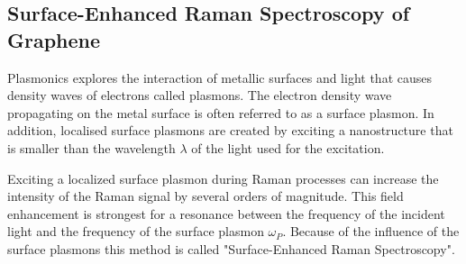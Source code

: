 \subsection{Surface-Enhanced Raman Spectroscopy of Graphene}

Plasmonics explores the interaction of metallic surfaces and light that causes density waves of electrons called plasmons. The electron density wave propagating on the metal surface is often referred to as a surface plasmon. In addition, localised surface plasmons are created by exciting a nanostructure that is smaller than the wavelength $\lambda$ of the light used for the excitation.

Exciting a localized surface plasmon during Raman processes can increase the intensity of the Raman signal by several orders of magnitude\mcite. This field enhancement is strongest for a resonance between the frequency of the incident light and the frequency of the surface plasmon $\omega_P$. Because of the influence of the surface plasmons this method is called "Surface-Enhanced Raman Spectroscopy".

